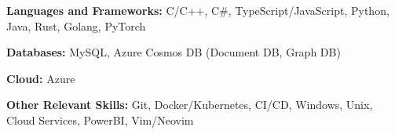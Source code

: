 \textbf{Languages and Frameworks:} C/C++, C\#, TypeScript/JavaScript, Python, Java, Rust, Golang, PyTorch \par
\textbf{Databases:} MySQL, Azure Cosmos DB (Document DB, Graph DB) \par
\textbf{Cloud:} Azure \par
\textbf{Other Relevant Skills:} Git, Docker/Kubernetes, CI/CD, Windows, Unix, Cloud Services, PowerBI, Vim/Neovim
